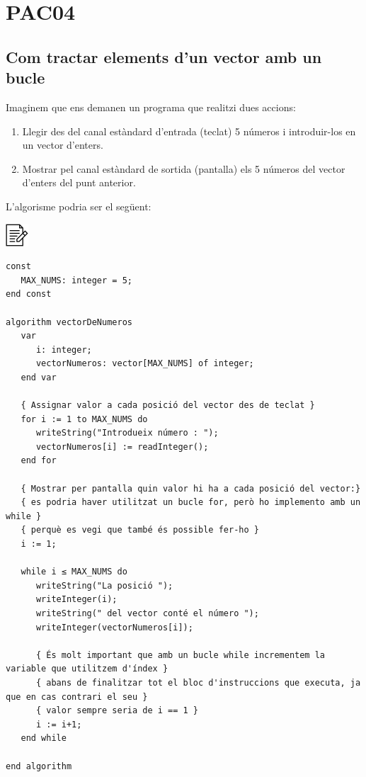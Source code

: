 \documentclass[
]{book}
\providecommand{\tightlist}{%
  \setlength{\itemsep}{0pt}\setlength{\parskip}{0pt}}
\begin{document}
\hypertarget{pac04}{%
\chapter{PAC04}\label{pac04}}

\hypertarget{com-tractar-elements-dun-vector-amb-un-bucle}{%
\section{Com tractar elements d'un vector amb un bucle}\label{com-tractar-elements-dun-vector-amb-un-bucle}}

Imaginem que ens demanen un programa que realitzi dues accions:

\begin{enumerate}
\def\labelenumi{\arabic{enumi}.}
\tightlist
\item
  Llegir des del canal estàndard d'entrada (teclat) 5 números i introduir-los en un vector d'enters.
\item
  Mostrar pel canal estàndard de sortida (pantalla) els 5 números del vector d'enters del punt anterior.
\end{enumerate}

L'algorisme podria ser el següent:

\includegraphics{./img/alg.png}

\begin{verbatim}
const
   MAX_NUMS: integer = 5;
end const

algorithm vectorDeNumeros
   var
      i: integer;
      vectorNumeros: vector[MAX_NUMS] of integer;
   end var

   { Assignar valor a cada posició del vector des de teclat }
   for i := 1 to MAX_NUMS do
      writeString("Introdueix número : ");
      vectorNumeros[i] := readInteger();
   end for

   { Mostrar per pantalla quin valor hi ha a cada posició del vector:}
   { es podria haver utilitzat un bucle for, però ho implemento amb un while }
   { perquè es vegi que també és possible fer-ho }
   i := 1;

   while i ≤ MAX_NUMS do
      writeString("La posició ");
      writeInteger(i);
      writeString(" del vector conté el número ");
      writeInteger(vectorNumeros[i]);

      { És molt important que amb un bucle while incrementem la variable que utilitzem d'índex }
      { abans de finalitzar tot el bloc d'instruccions que executa, ja que en cas contrari el seu }
      { valor sempre seria de i == 1 }
      i := i+1;
   end while

end algorithm
\end{verbatim}
\end{document}
